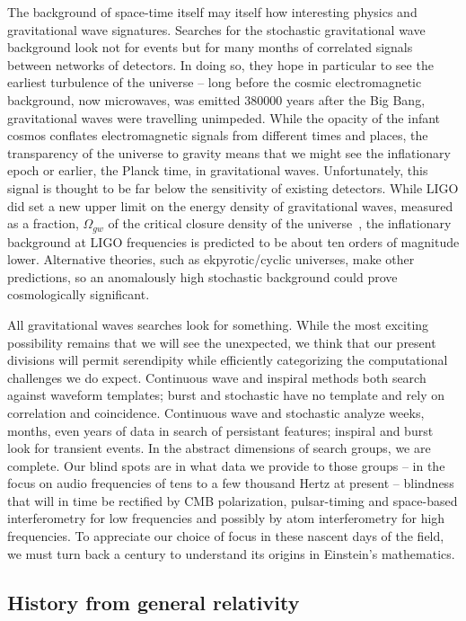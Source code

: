 The background of space-time itself may itself how interesting physics and gravitational wave signatures. Searches for the stochastic gravitational wave background look not for events but for many months of correlated signals between networks of detectors. In doing so, they hope in particular to see the earliest turbulence of the universe -- long before the cosmic electromagnetic background, now microwaves, was emitted 380000 years after the Big Bang, gravitational waves were travelling unimpeded. While the opacity of the infant cosmos conflates electromagnetic signals from different times and places, the transparency of the universe to gravity means that we might see the inflationary epoch or earlier, the Planck time, in gravitational waves. Unfortunately, this signal is thought to be far below the sensitivity of existing detectors. While LIGO did set a new upper limit on the energy density of gravitational waves, measured as a fraction, $\Omega_{gw}$ of the critical closure density of the universe~\cite{LIGOStochasticNature2009}, the inflationary background at LIGO frequencies is predicted to be about ten orders of magnitude lower. Alternative theories, such as ekpyrotic/cyclic universes, make other predictions, so an anomalously high stochastic background could prove cosmologically significant.

All gravitational waves searches look for something. While the most exciting possibility remains that we will see the unexpected, we think that our present divisions will permit serendipity while efficiently categorizing the computational challenges we do expect. Continuous wave and inspiral methods both search against waveform templates; burst and stochastic have no template and rely on correlation and coincidence. Continuous wave and stochastic analyze weeks, months, even years of data in search of persistant features; inspiral and burst look for transient events. In the abstract dimensions of search groups, we are complete. Our blind spots are in what data we provide to those groups -- in the focus on audio frequencies of tens to a few thousand Hertz at present -- blindness that will in time be rectified by CMB polarization, pulsar-timing and space-based interferometry for low frequencies and possibly by atom interferometry for high frequencies. To appreciate our choice of focus in these nascent days of the field, we must turn back a century to understand its origins in Einstein's mathematics.

        \subsection{History from general relativity}
        \label{history_GR}

